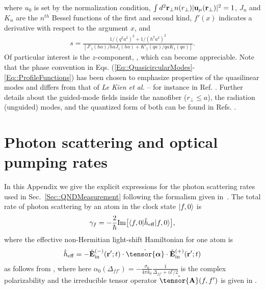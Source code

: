 \documentclass[aps,pra,twocolumn]{revtex4-1} %
\newcommand{\poltens}{\hat{\tensor{\boldsymbol{\alpha}}}}
\newcommand{\charpol}{\alpha_0(\Delta_{f\!f'})}
\begin{document}
\begin{appendix}
where $u_0$ is set by the normalization condition, $\int d^2 \mathbf{r}_\perp n(r_\perp) | \mathbf{u}_\mu(\mathbf{r}_\perp)|^2=1$, $J_n$ and $K_n$ are the $n^{th}$ Bessel functions of the first and second kind, $f'(x)$ indicates a derivative with respect to the argument $x$, and 
	\begin{align}
		s = \frac{1/(q^2 a^2)^{2} + 1/(h^2 a^2)^{2}}{[J'_1(ha)/haJ_1(ha) + K'_1(qa)/qaK_1(qa)]}.
	\end{align}  
Of particular interest is the $z$-component, , which can become appreciable.  Note that the phase convention in Eqs. (\ref{Eq::QuasicircularModes}-\ref{Eq::ProfileFunctions}) has been chosen to emphasize properties of the quasilinear modes and differs from that of \emph{Le Kien et al.} -- for instance in Ref. \cite{le_kien_propagation_2014}.  
Further details about the guided-mode fields inside the nanofiber ($r_\perp\leq a$), the radiation (unguided) modes, and the quantized form of both can be found in Refs. \cite{sondergaard_general_2001, tong_single-mode_2004, kien_field_2004, le_kien_spontaneous_2005, vetsch_eugen_optical_2010}.


\section{Photon scattering and optical pumping rates} \label{Appendix::Rates}	

In this Appendix we give the explicit expressions for the photon scattering rates used in Sec.~\ref{Sec::QNDMeasurement} following the formalism given in~\cite{deutsch_quantum_2010}.  The total rate of photon scattering by an atom in the clock state $\lvert{f,0}\rangle$ is
	\begin{equation}\label{Eq::gammaf}
		\gamma_{f}=- \frac{2}{\hbar} {\rm Im} \big[ \langle{f,0}\rvert \hat{h}_{\rm eff}\lvert{f,0}\rangle \big] ,
	\end{equation}
where the effective non-Hermitian light-shift Hamiltonian for one atom is 
\begin{align}
\hat{h}_{\rm eff} = - \hat{\mathbf{E}}^{(-)}_{\rm in}(\mathbf{r}' ; t ) \cdot \poltens \cdot \hat{\mathbf{E}}^{(+)}_{\rm in}(\mathbf{r}' ;t )
\end{align}
as follows from , where here $\charpol = -\frac{\sigma_0}{4\pi k_0}\frac{1}{\Delta_{ff'}+i\Gamma/2}$ is the complex polarizability and the irreducible tensor operator $ \hat{\tensor{\mbf{A}}}(f,f') $ is given in .



\end{appendix}
\end{document}
